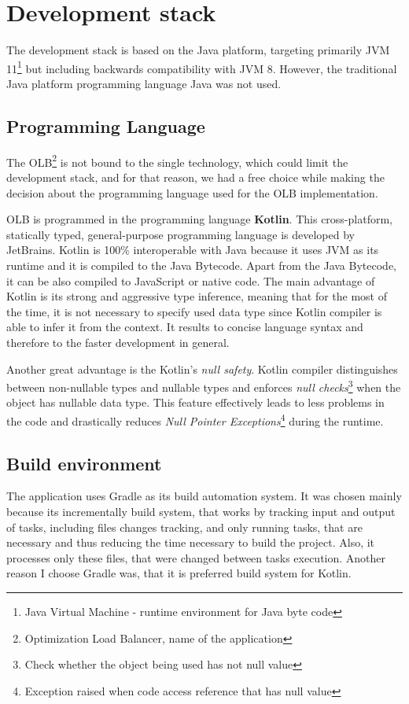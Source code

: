 \section{Development stack}\label{sec:development-stack}
The development stack is based on the Java platform, 
targeting primarily JVM 11\footnote{Java Virtual Machine - runtime environment for Java byte code}
but including backwards compatibility with JVM 8.
However, 
the traditional Java platform programming language Java was not used.

\subsection{Programming Language}\label{subsec:programming-language}
The OLB\footnote{Optimization Load Balancer, name of the application} is not bound to the single technology, 
which could limit the development stack, and for that reason,
we had a free choice while making the decision about the programming language used for the OLB implementation.

OLB is programmed in the programming language \textbf{Kotlin}.
This cross-platform, statically typed, general-purpose programming language is developed by JetBrains\cite{kotlinReference}.
Kotlin is 100\% interoperable with Java because it uses JVM as its runtime and it is compiled to the Java Bytecode.
Apart from the Java Bytecode, it can be also compiled to JavaScript or native code.\cite{kotlinReference}
The main advantage of Kotlin is its strong and aggressive type inference,
meaning that for the most of the time,
it is not necessary to specify used data type since Kotlin compiler is able to infer it from the context.\cite{kotlinReference}
It results to concise language syntax and therefore to the faster development in general.

Another great advantage is the Kotlin's \textit{null safety}. 
Kotlin compiler distinguishes between non-nullable types and nullable types 
and enforces \textit{null checks}\footnote{Check whether the object being used has not null value} when the object has nullable data type.
This feature effectively leads to less problems in the code
and drastically reduces \textit{Null Pointer Exceptions}\footnote{Exception raised when code access reference that has null value}
during the runtime.

\subsection{Build environment}
The application uses Gradle as its build automation system.
It was chosen mainly because its incrementally build system,
that works by tracking input and output of tasks, 
including files changes tracking, and only running tasks, that are necessary
and thus reducing the time necessary to build the project. 
Also, it processes only these files, that were changed between tasks execution. 
Another reason I choose Gradle was, that it is preferred build system for Kotlin.

